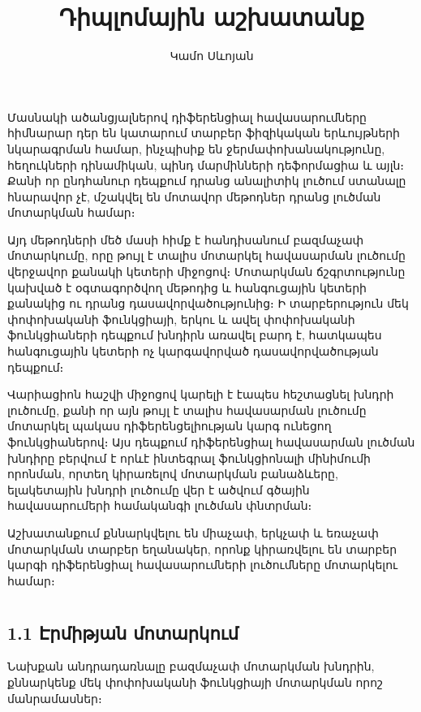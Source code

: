 \documentclass[fleqn, bachelor,subf,12pt,notitlepage]{article}
\title{Դիպլոմային աշխատանք}
\author{Կամո Սևոյան}
\begin{document}
\section*{}

\sloppy

\hspace{\parindent}Մասնակի ածանցյալներով դիֆերենցիալ հավասարումները հիմնարար դեր են կատարում տարբեր ֆիզիկական երևույթների նկարագրման համար, ինչպիսիք են ջերմափոխանակությունը, հեղուկների դինամիկան, պինդ մարմինների դեֆորմացիա և այլն։ Քանի որ ընդհանուր դեպքում դրանց անալիտիկ լուծում ստանալը հնարավոր չէ, մշակվել են մոտավոր մեթոդներ դրանց լուծման մոտարկման համար։ 

Այդ մեթոդների մեծ մասի հիմք է հանդիսանում բազմաչափ մոտարկումը, որը թույլ է տալիս մոտարկել հավասարման լուծումը վերջավոր քանակի կետերի միջոցով։
Մոտարկման ճշգրտությունը կախված է օգտագործվող մեթոդից և հանգուցային կետերի քանակից ու դրանց դասավորվածությունից։ Ի տարբերություն մեկ փոփոխականի ֆունկցիայի,  երկու և ավել փոփոխականի ֆունկցիաների դեպքում խնդիրն առավել բարդ է, հատկապես հանգուցային կետերի ոչ կարգավորված դասավորվածության դեպքում։

Վարիացիոն հաշվի միջոցով կարելի է էապես հեշտացնել խնդրի լուծումը, քանի որ այն թույլ է տալիս հավասարման լուծումը մոտարկել պակաս դիֆերենցելիության կարգ ունեցող ֆունկցիաներով։ Այս դեպքում դիֆերենցիալ հավասարման լուծման խնդիրը բերվում է որևէ ինտեգրալ ֆունկցիոնալի մինիմումի որոնման, որտեղ կիրառելով մոտարկման բանաձևերը, ելակետային խնդրի լուծումը վեր է ածվում գծային հավասարումերի համականգի լուծման փնտրման։

Աշխատանքում քննարկվելու են միաչափ, երկչափ և եռաչափ մոտարկման տարբեր եղանակեր, որոնք կիրառվելու են տարբեր կարգի դիֆերենցիալ հավասարումների լուծումները մոտարկելու համար։
\newpage


\section*{}
\subsection*{{1.1 Էրմիթյան մոտարկում}}
\hspace{\parindent}Նախքան անդրադառնալը բազմաչափ մոտարկման խնդրին, քննարկենք մեկ փոփոխականի ֆունկցիայի մոտարկման որոշ մանրամասներ։
\end{document}
